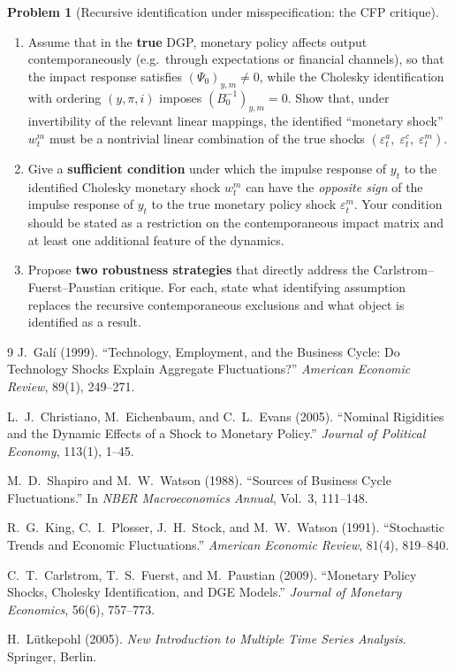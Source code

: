 \documentclass[12pt]{article}
\theoremstyle{definition} %
\newtheorem{problem}{Problem}
\theoremstyle{plain}
\begin{document}
\begin{problem}[Recursive identification under misspecification: the CFP critique]
\begin{enumerate}[label=(\alph*)]
\item Assume that in the \textbf{true} DGP, monetary policy affects output contemporaneously (e.g.\ through expectations or financial channels), so that the impact response satisfies $(\Psi_0)_{y,m} \neq 0$, while the Cholesky identification with ordering $(y,\pi,i)$ imposes $(B_0^{-1})_{y,m} = 0$. Show that, under invertibility of the relevant linear mappings, the identified ``monetary shock'' $w_t^m$ must be a nontrivial linear combination of the true shocks $(\varepsilon_t^a,\; \varepsilon_t^c,\; \varepsilon_t^m)$.

\item Give a \textbf{sufficient condition} under which the impulse response of $y_t$ to the identified Cholesky monetary shock $w_t^m$ can have the \emph{opposite sign} of the impulse response of $y_t$ to the true monetary policy shock $\varepsilon_t^m$. Your condition should be stated as a restriction on the contemporaneous impact matrix and at least one additional feature of the dynamics.

\item Propose \textbf{two robustness strategies} that directly address the Carlstrom--Fuerst--Paustian critique. For each, state what identifying assumption replaces the recursive contemporaneous exclusions and what object is identified as a result.
\end{enumerate}
\end{problem}

\vspace{1.5em}

\begin{thebibliography}{9}
J.\ Galí (1999). ``Technology, Employment, and the Business Cycle: Do Technology Shocks Explain Aggregate Fluctuations?'' \emph{American Economic Review}, 89(1), 249--271.

L.\ J.\ Christiano, M.\ Eichenbaum, and C.\ L.\ Evans (2005). ``Nominal Rigidities and the Dynamic Effects of a Shock to Monetary Policy.'' \emph{Journal of Political Economy}, 113(1), 1--45.

M.\ D.\ Shapiro and M.\ W.\ Watson (1988). ``Sources of Business Cycle Fluctuations.'' In \emph{NBER Macroeconomics Annual}, Vol.\ 3, 111--148.

R.\ G.\ King, C.\ I.\ Plosser, J.\ H.\ Stock, and M.\ W.\ Watson (1991). ``Stochastic Trends and Economic Fluctuations.'' \emph{American Economic Review}, 81(4), 819--840.

C.\ T.\ Carlstrom, T.\ S.\ Fuerst, and M.\ Paustian (2009). ``Monetary Policy Shocks, Cholesky Identification, and DGE Models.'' \emph{Journal of Monetary Economics}, 56(6), 757--773.

H.\ Lütkepohl (2005). \emph{New Introduction to Multiple Time Series Analysis}. Springer, Berlin.
\end{thebibliography}
\end{document}
